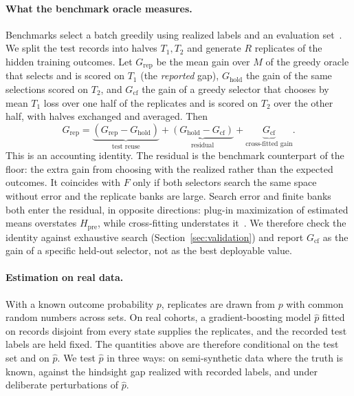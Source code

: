 \documentclass[runningheads]{llncs}
\newcommand{\Hpre}{H_{\mathrm{pre}}}
\begin{document}
\paragraph{What the benchmark oracle measures.} Benchmarks select a batch greedily using realized labels and an evaluation set~\cite{werner2023comparable,werner2024cdalbench}. We split the test records into halves $T_1,T_2$ and generate $R$ replicates of the hidden training outcomes. Let $G_{\mathrm{rep}}$ be the mean gain over $M$ of the greedy oracle that selects and is scored on $T_1$ (the \emph{reported} gap), $G_{\mathrm{hold}}$ the gain of the same selections scored on $T_2$, and $G_{\mathrm{cf}}$ the gain of a greedy selector that chooses by mean $T_1$ loss over one half of the replicates and is scored on $T_2$ over the other half, with halves exchanged and averaged. Then
\begin{equation}
 G_{\mathrm{rep}}=\underbrace{(G_{\mathrm{rep}}-G_{\mathrm{hold}})}_{\text{test reuse}}+\underbrace{(G_{\mathrm{hold}}-G_{\mathrm{cf}})}_{\text{residual}}+\underbrace{G_{\mathrm{cf}}}_{\text{cross-fitted gain}} .\label{eq:greedy}
\end{equation}
This is an accounting identity. The residual is the benchmark counterpart of the floor: the extra gain from choosing with the realized rather than the expected outcomes. It coincides with $F$ only if both selectors search the same space without error and the replicate banks are large. Search error and finite banks both enter the residual, in opposite directions: plug-in maximization of estimated means overstates $\Hpre$, while cross-fitting understates it~\cite{smith2006optimizer,cawley2010overfitting}. We therefore check the identity against exhaustive search (Section~\ref{sec:validation}) and report $G_{\mathrm{cf}}$ as the gain of a specific held-out selector, not as the best deployable value.

\paragraph{Estimation on real data.} With a known outcome probability $p$, replicates are drawn from $p$ with common random numbers across sets. On real cohorts, a gradient-boosting model $\hat p$ fitted on records disjoint from every state supplies the replicates, and the recorded test labels are held fixed. The quantities above are therefore conditional on the test set and on $\hat p$. We test $\hat p$ in three ways: on semi-synthetic data where the truth is known, against the hindsight gap realized with recorded labels, and under deliberate perturbations of $\hat p$.
\end{document}
